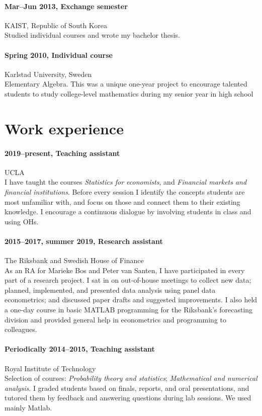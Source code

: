 \documentclass[letterpaper,10pt]{article}
\begin{document}
\paragraph{Mar--Jun 2013, Exchange semester}\hfill KAIST, Republic of South Korea\\
Studied individual courses and wrote my bachelor thesis.


\paragraph{Spring 2010, Individual course}\hfill Karlstad University, Sweden\\
Elementary Algebra. This was a unique one-year project to encourage talented students to study college-level mathematics during my senior year in high school

\section*{Work experience}
\paragraph{2019--present, Teaching assistant}\hfill UCLA\\
I have taught the courses \emph{Statistics for economists}, and \emph{Financial markets and financial institutions}. Before every session I identify the concepts students are most unfamiliar with, and focus on those and connect them to their existing knowledge. I encourage a continuous dialogue by involving students in class and using OHs.

\paragraph{2015--2017, summer 2019, Research assistant}\hfill The Riksbank and Swedish House of Finance\\
As an RA for Marieke Bos and Peter van Santen, I have participated in every part of a research project. I sat in on out-of-house meetings to collect new data; planned, implemented, and presented data analysis using panel data econometrics; and discussed paper drafts and suggested improvements. I also held a one-day course in basic MATLAB programming for the Riksbank's forecasting division and provided general help in econometrics and programming to colleagues.

\paragraph{Periodically 2014--2015, Teaching assistant}
\hfill Royal Institute of Technology\\
Selection of courses: \emph{Probability theory and statistics}; \emph{Mathematical and numerical analysis}. I graded students based on finals, reports, and oral presentations, and tutored them by feedback and answering questions during lab sessions. We used mainly Matlab.
\end{document}

